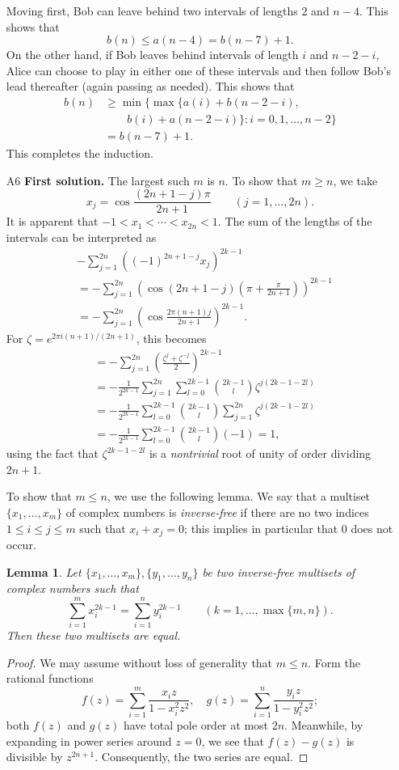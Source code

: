 \documentclass[amssymb,twocolumn,pra,10pt,aps]{revtex4-1}
\newtheorem*{lemma*}{Lemma}
\begin{document}
\begin{itemize}
Moving first, Bob can leave behind two intervals of lengths 2 and $n-4$. This shows that
\[
b(n) \leq a(n-4) = b(n-7) + 1.
\]
On the other hand, if Bob leaves behind intervals of length $i$ and $n-2-i$, Alice can choose to play in either one of these intervals and then follow Bob's lead thereafter (again passing as needed). This shows that
\begin{align*}
b(n) &\geq \min\{\max\{a(i) + b(n-2-i), \\
& \qquad b(i)+a(n-2-i)\}: i =0,1,\dots,n-2\} \\
&= b(n-7)+1.
\end{align*}
This completes the induction.

\item[A6]
\textbf{First solution.}
The largest such $m$ is $n$.
To show that $m \geq n$,
we take
\[
x_j = \cos \frac{(2n+1-j)\pi}{2n+1} \qquad (j=1,\dots,2n).
\]
It is apparent that $-1 < x_1 < \cdots < x_{2n} < 1$.
The sum of the lengths of the intervals can be interpreted as
\begin{align*}
& -\sum_{j=1}^{2n} ((-1)^{2n+1-j} x_j)^{2k-1} \\
&= -\sum_{j=1}^{2n} \left(\cos (2n+1-j)\left(\pi + \frac{\pi}{2n+1} \right)\right)^{2k-1} \\
&= -\sum_{j=1}^{2n} \left(\cos \frac{2\pi(n+1)j}{2n+1}\right)^{2k-1}.
\end{align*}
For $\zeta = e^{2 \pi i (n+1)/(2n+1)}$, this becomes
\begin{align*}
&= -\sum_{j=1}^{2n} \left( \frac{\zeta^j + \zeta^{-j}}{2} \right)^{2k-1} \\
&= -\frac{1}{2^{2k-1}}\sum_{j=1}^{2n} \sum_{l=0}^{2k-1} 
\binom{2k-1}{l} \zeta^{j(2k-1-2l)} \\
&= -\frac{1}{2^{2k-1}} \sum_{l=0}^{2k-1} \binom{2k-1}{l}
\sum_{j=1}^{2n}
\zeta^{j(2k-1-2l)}  \\
&= -\frac{1}{2^{2k-1}} \sum_{l=0}^{2k-1} \binom{2k-1}{l}
(-1) = 1,
\end{align*}
using the fact that $\zeta^{2k-1-2l}$ is a \emph{nontrivial} root of unity of order dividing $2n+1$.

To show that $m \leq n$, we use the following lemma.
We say that a multiset $\{x_1,\dots,x_m\}$ of complex numbers is \emph{inverse-free} if there are no two indices $1 \leq i \leq j \leq m$ such that $x_i + x_j = 0$; this implies in particular that 0 does not occur.
\begin{lemma*}
Let $\{x_1,\dots,x_m\},\{y_1,\dots,y_n\}$ be two inverse-free multisets of complex numbers such that
\[
\sum_{i=1}^m x_i^{2k-1} = \sum_{i=1}^n y_i^{2k-1} \qquad (k=1,\dots,\max\{m,n\}).
\]
Then these two multisets are equal.
\end{lemma*}
\begin{proof}
We may assume without loss of generality that $m \leq n$.
Form the rational functions
\[
f(z) = \sum_{i=1}^m \frac{x_i z}{1 - x_i^2 z^2}, \quad
g(z) = \sum_{i=1}^n \frac{y_i z}{1 - y_i^2 z^2};
\]
both $f(z)$ and $g(z)$ have total pole order at most $2n$.
Meanwhile, by expanding in power series around $z=0$, we see that $f(z)-g(z)$ is divisible by $z^{2n+1}$.
Consequently, the two series are equal. 


\end{proof}
\end{itemize}
\end{document}
